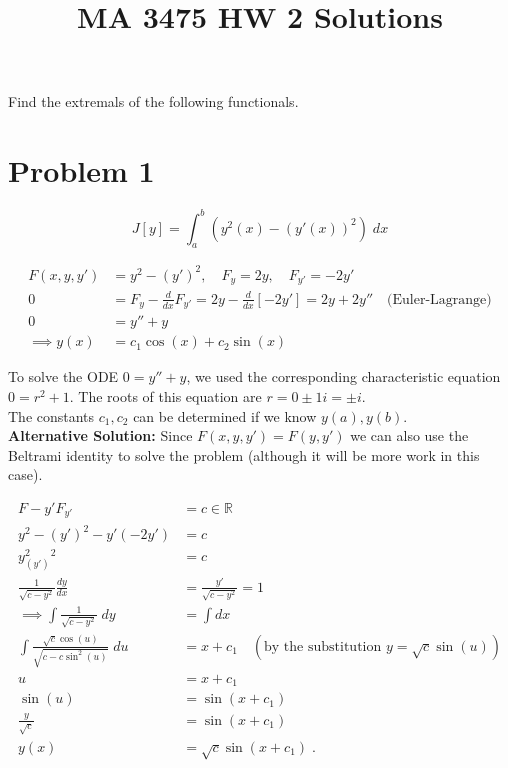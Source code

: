 \documentclass[a4paper]{article}
\title{MA 3475 HW 2 Solutions}
\begin{document}
\maketitle

Find the extremals of the following functionals. 
\section*{Problem 1}

$$J[y] = \int_a^b \left(y^2(x) - (y'(x))^2 \right) \; dx $$

\begin{align*}
F(x,y,y') &= y^2 - (y')^2, \quad F_y = 2y, \quad F_{y'} = -2y' \\
0 &= F_y - \frac{d}{dx}F_{y'} = 2y - \frac{d}{dx}[-2y'] = 2y+2y''\quad \text{(Euler-Lagrange)}\\
 0 &= y'' + y \\
\implies y(x) &= c_1\cos(x) + c_2 \sin(x) 
\end{align*}

To solve the ODE $0 = y'' + y$, we used the corresponding characteristic equation $0 = r^2 + 1$. The roots of this equation are $r = 0 \pm 1i = \pm i$.\\

The constants $c_1,c_2$ can be determined if we know $y(a),y(b)$. \\

{\bf Alternative Solution:} Since $F(x,y,y') = F(y,y')$ we can also use the Beltrami identity to solve the problem (although it will be more work in this case).

\begin{align*}
F - y'F_{y'} &= c \in \mathbb{R} \\
y^2 - (y')^2 - y'(-2y') &= c \\
y^2 _ (y')^2 &=c \\
\frac{1}{\sqrt{c-y^2}}\frac{dy}{dx} &= \frac{y'}{\sqrt{c-y^2}} = 1 \\
\implies \int \frac{1}{\sqrt{c-y^2}} \; dy &= \int dx \\
\int \frac{\sqrt{c}\cos(u)}{\sqrt{c-c\sin^2(u)}} \; du &= x+c_1 \quad (\text{by the substitution } y = \sqrt{c}\sin(u)) \\
u &= x+c_1 \\
\sin(u) &= \sin(x+c_1) \\
\frac{y}{\sqrt{c}} &= \sin(x + c_1) \\
y(x) &= \sqrt{c}\sin(x+c_1) \;.
\end{align*}
\end{document}
